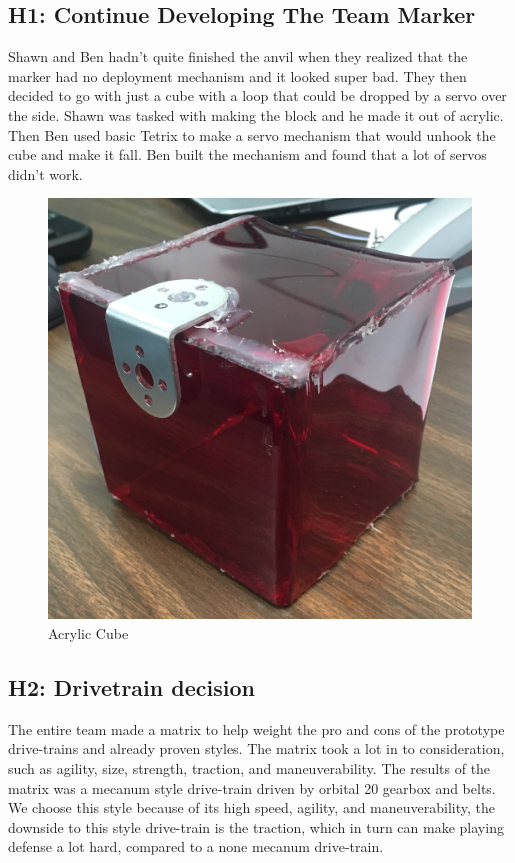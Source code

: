 \documentclass{article}
\begin{document}
\subsection{H1: Continue Developing The Team Marker}

Shawn and Ben hadn't quite finished the anvil when they realized that the marker had no deployment mechanism and it looked super bad. They then decided to go with just a cube with a loop that could be dropped by a servo over the side. Shawn was tasked with making the block and he made it out of acrylic. Then Ben used basic Tetrix to make a servo mechanism that would unhook the cube and make it fall. Ben built the mechanism and found that a lot of servos didn't work.

\begin{figure}
    \centering
    \includegraphics[width=.6\textwidth]{05_10-01/images/cube.jpg}
    \caption{Acrylic Cube}
    \label{fig:cube}
\end{figure}



\subsection{H2: Drivetrain decision}

The entire team made a matrix to help weight the pro and cons of the prototype drive-trains and already proven styles. The matrix took a lot in to consideration, such as agility, size, strength, traction, and maneuverability. The results of the matrix was a mecanum style drive-train driven by orbital 20 gearbox and belts. We choose this style because of its high speed, agility, and maneuverability, the downside to this style drive-train is the traction, which in turn can make playing defense a lot hard, compared to a none mecanum drive-train.  
\end{document}
